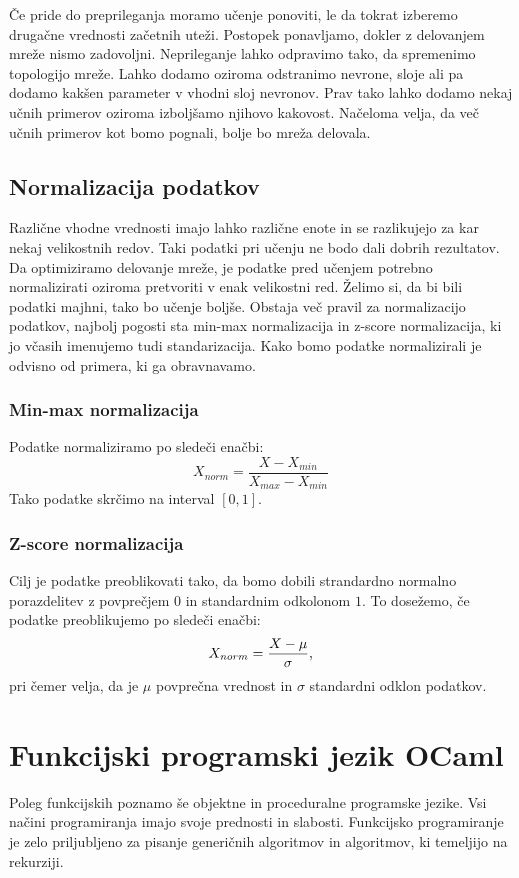 \documentclass[mat1]{fmfdelo}
\begin{document}
Če pride do preprileganja moramo učenje ponoviti, le da tokrat izberemo drugačne vrednosti začetnih uteži. Postopek ponavljamo, dokler z delovanjem mreže nismo zadovoljni. Neprileganje lahko odpravimo tako, da spremenimo topologijo mreže. Lahko dodamo oziroma odstranimo nevrone, sloje ali pa dodamo kakšen parameter v vhodni sloj nevronov. Prav tako lahko dodamo nekaj učnih primerov oziroma izboljšamo njihovo kakovost. Načeloma velja, da več učnih primerov kot bomo pognali, bolje bo mreža delovala.
%
\subsection{Normalizacija podatkov}
Različne vhodne vrednosti imajo lahko različne enote in se razlikujejo za kar nekaj velikostnih redov. Taki podatki pri učenju ne bodo dali dobrih rezultatov. Da optimiziramo delovanje mreže, je podatke pred učenjem potrebno normalizirati oziroma pretvoriti v enak velikostni red. Želimo si, da bi bili podatki majhni, tako bo učenje boljše. Obstaja več pravil za normalizacijo podatkov, najbolj pogosti sta min-max normalizacija in z-score normalizacija, ki jo včasih imenujemo tudi standarizacija. Kako bomo podatke normalizirali je odvisno od primera, ki ga obravnavamo.
%
\subsubsection{Min-max normalizacija}
Podatke normaliziramo po sledeči enačbi:
%
\begin{equation}
X_{norm} = \frac{X -X_{min}}{X_{max}-X_{min}}
\end{equation}
%
Tako podatke skrčimo na interval $[0,1]$. 
%
\subsubsection{Z-score normalizacija}
Cilj je podatke preoblikovati tako, da bomo dobili strandardno normalno porazdelitev z povprečjem $0$ in standardnim odkolonom $1$. To dosežemo, če podatke preoblikujemo po sledeči enačbi:
%
\begin{equation}
X_{norm} = \frac{X - \mu}{\sigma} \text,
\end{equation}
%
pri čemer velja, da je $\mu$  povprečna vrednost in $\sigma$ standardni odklon podatkov.
%
\section{Funkcijski programski jezik OCaml}
Poleg funkcijskih poznamo še objektne in proceduralne programske jezike. Vsi načini programiranja imajo svoje prednosti in slabosti. Funkcijsko programiranje je zelo priljubljeno za pisanje generičnih algoritmov in algoritmov, ki temeljijo na rekurziji. 
\end{document}
